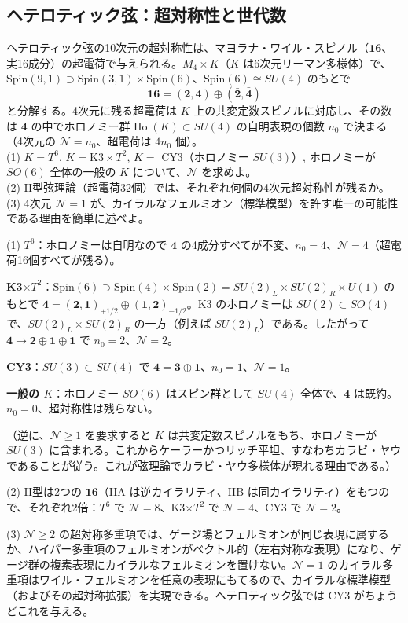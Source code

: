 \subsection{ヘテロティック弦：超対称性と世代数}

\begin{problem}[難易度 B]\label{ch10-prob-susy}
ヘテロティック弦の10次元の超対称性は、マヨラナ・ワイル・スピノル（$\mathbf{16}$、実16成分）の超電荷で与えられる。$M_4\times K$（$K$ は6次元リーマン多様体）で、$\mathrm{Spin}(9,1)\supset\mathrm{Spin}(3,1)\times\mathrm{Spin}(6)$、$\mathrm{Spin}(6)\cong SU(4)$ のもとで
\[
\mathbf{16}=(\mathbf 2,\mathbf 4)\oplus(\bar{\mathbf 2},\bar{\mathbf 4})
\]
と分解する。4次元に残る超電荷は $K$ 上の共変定数スピノルに対応し、その数は $\mathbf 4$ の中でホロノミー群 $\mathrm{Hol}(K)\subset SU(4)$ の自明表現の個数 $n_0$ で決まる（4次元の $\mathcal N=n_0$、超電荷は $4n_0$ 個）。\\
(1) $K=T^6$, $K=\mathrm{K3}\times T^2$, $K=$ CY3（ホロノミー $SU(3)$）, ホロノミーが $SO(6)$ 全体の一般の $K$ について、$\mathcal N$ を求めよ。\\
(2) II型弦理論（超電荷32個）では、それぞれ何個の4次元超対称性が残るか。\\
(3) 4次元 $\mathcal N=1$ が、カイラルなフェルミオン（標準模型）を許す唯一の可能性である理由を簡単に述べよ。
\end{problem}

\begin{solution}
(1) \textbf{$T^6$}：ホロノミーは自明なので $\mathbf 4$ の4成分すべてが不変、$n_0=4$、$\mathcal N=4$（超電荷16個すべてが残る）。

\textbf{K3$\times T^2$}：$\mathrm{Spin}(6)\supset\mathrm{Spin}(4)\times\mathrm{Spin}(2)=SU(2)_L\times SU(2)_R\times U(1)$ のもとで $\mathbf 4=(\mathbf 2,\mathbf 1)_{+1/2}\oplus(\mathbf 1,\mathbf 2)_{-1/2}$。K3 のホロノミーは $SU(2)\subset SO(4)$ で、$SU(2)_L\times SU(2)_R$ の一方（例えば $SU(2)_L$）である。したがって $\mathbf 4\to\mathbf 2\oplus\mathbf 1\oplus\mathbf 1$ で $n_0=2$、$\mathcal N=2$。

\textbf{CY3}：$SU(3)\subset SU(4)$ で $\mathbf 4=\mathbf 3\oplus\mathbf 1$、$n_0=1$、$\mathcal N=1$。

\textbf{一般の $K$}：ホロノミー $SO(6)$ はスピン群として $SU(4)$ 全体で、$\mathbf 4$ は既約。$n_0=0$、超対称性は残らない。

（逆に、$\mathcal N\ge1$ を要求すると $K$ は共変定数スピノルをもち、ホロノミーが $SU(3)$ に含まれる。これからケーラーかつリッチ平坦、すなわちカラビ・ヤウであることが従う。これが弦理論でカラビ・ヤウ多様体が現れる理由である。）

(2) II型は2つの $\mathbf{16}$（IIA は逆カイラリティ、IIB は同カイラリティ）をもつので、それぞれ2倍：$T^6$ で $\mathcal N=8$、K3$\times T^2$ で $\mathcal N=4$、CY3 で $\mathcal N=2$。

(3) $\mathcal N\ge2$ の超対称多重項では、ゲージ場とフェルミオンが同じ表現に属するか、ハイパー多重項のフェルミオンがベクトル的（左右対称な表現）になり、ゲージ群の複素表現にカイラルなフェルミオンを置けない。$\mathcal N=1$ のカイラル多重項はワイル・フェルミオンを任意の表現にもてるので、カイラルな標準模型（およびその超対称拡張）を実現できる。ヘテロティック弦では CY3 がちょうどこれを与える。
\end{solution}

